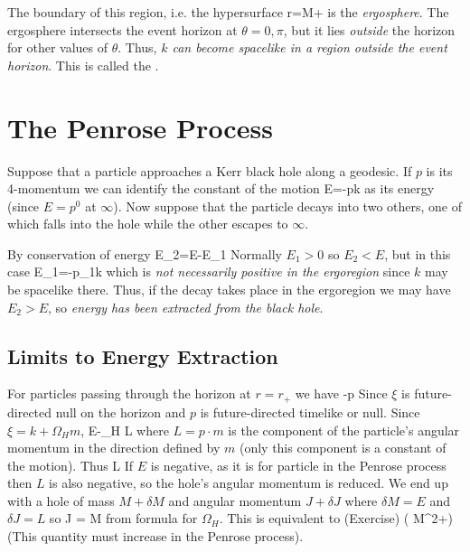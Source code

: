 The boundary of this region, i.e. the hypersurface 
\be
r=M+
\ee
is the \emph{ergosphere}.  The ergosphere intersects the event horizon at 
$\theta=0,\pi$, but it lies \emph{outside} the horizon for other values of
$\theta$.  Thus, \emph{$k$ can become spacelike in a region outside the event
horizon}.  This is called the .
\begin{center}\end{center}

\section{The Penrose Process}

Suppose that a particle approaches a Kerr black hole along a geodesic.  If 
$p$ is its 4-momentum we can identify the constant of the motion
\be
E=-p\cdot k
\ee
as its energy (since $E=p^0$ at $\infty$).  Now suppose that the particle 
decays into two others, one of which falls into the hole while the other escapes
to $\infty$.
\begin{center}\end{center}
By conservation of energy
\be
E_2=E-E_1
\ee
Normally $E_1>0$ so $E_2 < E$, but in this case
\be
E_1=-p_1\cdot k
\ee
which is \emph{not necessarily positive in the ergoregion} since $k$ may 
be spacelike there.  Thus, if the decay takes place in the ergoregion we may
have $E_2>E$, so \emph{energy has been extracted from the black hole}.

\subsection{Limits to Energy Extraction}

For particles passing through the horizon at $r=r_+$ we have
\be
-p\cdot \xi {}
\ee 
Since $\xi$ is future-directed null on the horizon and $p$ is 
future-directed timelike or null.  Since $\xi = k+\Omega_H m$,
\be
E-\Omega_H L  
\ee
where $L=p\cdot m$ is the component of the particle's angular momentum in 
the direction defined by $m$ (only this component is a constant of the motion). 
Thus
\be
L \le {}
\ee
If $E$ is negative, as it is for particle  in the Penrose process 
then $L$ is also negative, so the hole's angular momentum is reduced.  We end up
with a hole of mass $M+\delta M$ and angular momentum $J+\delta J$ where $\delta
M=E$ and $\delta J=L$ so
\be
\delta J \le {} = 
 \delta M
\ee 
from formula for $\Omega_H$.  This is equivalent to (Exercise)
\be
\delta\left( M^2+\right)  
\ee
(This quantity must increase in the Penrose process).


